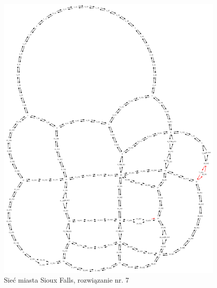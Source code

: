 \documentclass[twoside,12pt]{report}
\begin{document}
\begin{figure}[ht]
\centering
\includegraphics[totalheight=0.580\textheight, angle=90]{img/sioux-out/7/network2}
\caption{Sieć miasta Sioux Falls, rozwiązanie nr. 7}
\label{sioux7}
\end{figure}
\end{document}
